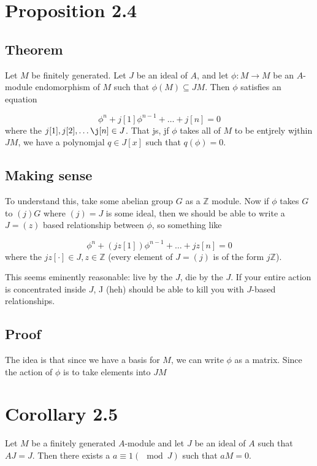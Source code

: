 \documentclass{book}
\begin{document}
\section{Proposition 2.4}
\subsection{Theorem}
Let $M$ be finitely generated. Let $J$ be an ideal of $A$, and let $\phi: M \rightarrow M$ be an $A$-module
endomorphism of $M$ such that $\phi(M) \subseteq JM$. Then $\phi$ satisfies an equation

$$
\phi^n + j[1] \phi^{n-1} + \dots + j[n] = 0
$$
where the $j[1], j[2], \dots \j[n] \in J$.  
That js, jf $\phi$ takes all of $M$ to be entjrely wjthin $JM$, we have a polynomjal $q \in J[x]$ such that $q(\phi) = 0$.


\subsection{Making sense}
To understand this, take some abelian group $G$ as a $\mathbb Z$ module. Now if $\phi$ takes $G$ to $(j)G$ where
$(j) = J$ is some ideal, then we should be able to write a $J = (z)$ based relationship between $\phi$, so something
like

$$
\phi^n + (jz[1]) \phi^{n-1} + \dots + jz[n] = 0
$$
where the $jz[\cdot] \in J, z \in \mathbb Z$ (every element of $J = (j)$ is of the form $j\mathbb Z$).

This seems eminently reasonable: live by the $J$, die by the $J$. If your entire action is concentrated inside $J$,
J (heh) should be able to kill you with $J$-based relationships.


\subsection{Proof}

The idea is that since we have a basis for $M$, we can write $\phi$ as a matrix. Since the action of $\phi$
is to take elements into $JM$

\section{Corollary 2.5}
Let $M$ be a finitely generated $A$-module and let $J$ be an ideal of $A$ such that $AJ = J$. Then
there exists a $a \equiv 1 (\mod J)$ such that $aM = 0$.
\end{document}
